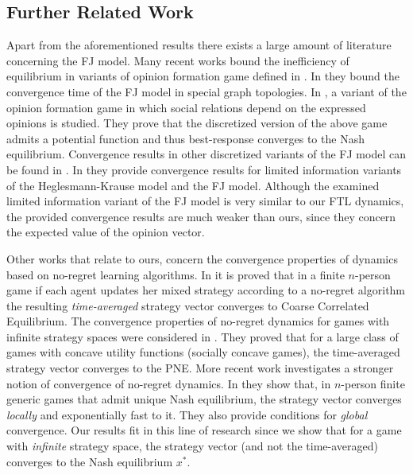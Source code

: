 \subsection{Further Related Work}

Apart from the aforementioned results there exists a large amount of literature
concerning the FJ model.  Many recent works \cite{BGM13,CKO13,BFM16,EFHS17}
bound the inefficiency of equilibrium in variants of opinion formation game
defined in \cite{BKO11}. In \cite{GS14} they bound the convergence time of
the FJ model in special graph topologies.  In \cite{BFM16}, a variant of the
opinion formation game in which social relations depend on the expressed
opinions is studied.  They prove that the discretized version of the above
game admits a potential function and thus best-response converges to the Nash
equilibrium. Convergence results in other discretized variants of the FJ model
can be found in \cite{YOASS13,FGV16}. In \cite{FPS16} they provide convergence
results for limited information variants of the Heglesmann-Krause model
\cite{HK} and the FJ model. Although the examined limited information variant 
of the FJ model is very similar to our FTL dynamics, the provided convergence results
are much weaker than ours, since they concern the expected value of the opinion vector.

Other works that relate to ours, concern the convergence properties of
dynamics based on no-regret learning algorithms.  In
\cite{FV97,FS99,SA00,SALS15} it is proved that in a finite $n$-person game if
each agent updates her mixed strategy according to a no-regret algorithm the
resulting \emph{time-averaged} strategy vector converges to Coarse Correlated
Equilibrium. The convergence properties of no-regret dynamics for games with
infinite strategy spaces were considered in \cite{EMN09}.  They proved that for
a large class of games with concave utility functions (socially concave games),
the time-averaged strategy vector converges to the PNE. More recent work
investigates a stronger notion of convergence of no-regret dynamics. In
\cite{CHM17} they show that, in $n$-person finite generic games that admit
unique Nash equilibrium, the strategy vector converges \emph{locally} and
exponentially fast to it. They also provide conditions for \emph{global}
convergence.  Our results fit in this line of research since we show that for a
game with \emph{infinite} strategy space, the strategy vector (and not the
time-averaged) converges to the Nash equilibrium $x^*$.

